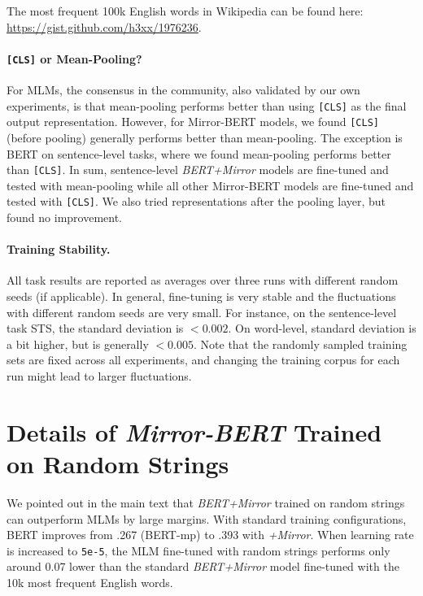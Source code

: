 \documentclass[11pt]{article}
\begin{document}
\vspace{1.2mm}
\noindent The most frequent 100k English words in Wikipedia can be found here: \\
\url{https://gist.github.com/h3xx/1976236}.


\paragraph{\texttt{[CLS]} or Mean-Pooling?} For MLMs, the consensus in the community, also validated by our own experiments, is that mean-pooling performs better than using \texttt{[CLS]} as the final output representation. However, for Mirror-BERT models, we found \texttt{[CLS]} (before pooling) generally performs better than mean-pooling. The exception is BERT on sentence-level tasks, where we found mean-pooling performs better than \texttt{[CLS]}. In sum, sentence-level \textit{BERT+Mirror} models are fine-tuned and tested with mean-pooling while all other Mirror-BERT models are fine-tuned and tested with \texttt{[CLS]}. We also tried representations after the pooling layer, but found no improvement.

\paragraph{Training Stability.} All task results are reported as averages over three runs with different random seeds (if applicable). In general, fine-tuning is very stable and the fluctuations with different random seeds are very small. For instance, on the sentence-level task STS, the standard deviation is $<0.002$. On word-level, standard deviation is a bit higher, but is generally $<0.005$. Note that the randomly sampled training sets are fixed across all experiments, and changing the training corpus for each run might lead to larger fluctuations. 

\section{Details of \textit{Mirror-BERT} Trained on Random Strings}
We pointed out in the main text that \textit{BERT+Mirror} trained on random strings can outperform MLMs by large margins. 
With standard training configurations, BERT improves from .267 (BERT-mp) to .393 with \textit{+Mirror}. When learning rate is increased to \texttt{5e-5}, the MLM fine-tuned with random strings performs only around 0.07 lower than the standard \textit{BERT+Mirror} model fine-tuned with the 10k most frequent English words.
\end{document}
